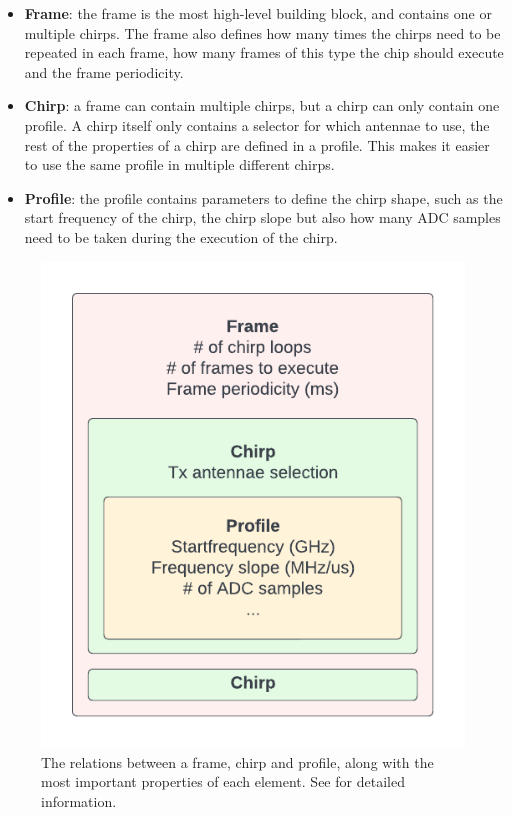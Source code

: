 \begin{itemize}
    \item \textbf{Frame}: the frame is the most high-level building block, and contains one or multiple chirps. The frame also defines how many times the chirps need to be repeated in each frame, how many frames of this type the chip should execute and the frame periodicity.
    \item \textbf{Chirp}: a frame can contain multiple chirps, but a chirp can only contain one profile. A chirp itself only contains a selector for which antennae to use, the rest of the properties of a chirp are defined in a profile. This makes it easier to use the same profile in multiple different chirps.
    \item \textbf{Profile}: the profile contains parameters to define the chirp shape, such as the start frequency of the chirp, the chirp slope but also how many ADC samples need to be taken during the execution of the chirp.
\end{itemize}

\begin{figure}[t]
\centering
\includegraphics[width=.5\textwidth]{figures/background/chirp frame profile.pdf}
\caption{The relations between a frame, chirp and profile, along with the most important properties of each element. See \cite{mmwavesdk_website} for detailed information.}
\label{fig:chirpframeprofile}
\end{figure}

